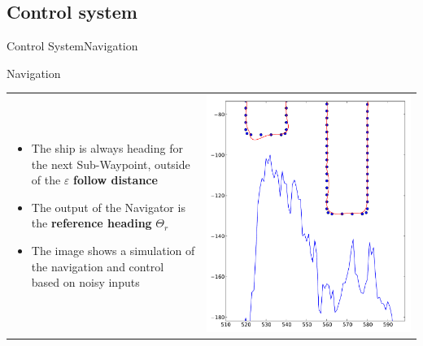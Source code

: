 \subsection{Control system}
\begin{frame}{Control System}{Navigation}
    \begin{block}{Navigation}
		\begin{tabular}{l l}
		\begin{minipage}{0.45\textwidth}
		\begin{itemize}
			\item The ship is always heading for the next Sub-Waypoint, outside of the $\varepsilon$ \textbf{follow distance}
			\item The output of the Navigator is the \textbf{reference heading} $\Theta_r$
			\item The image shows a simulation of the navigation and control based on noisy inputs
		\end{itemize}
		\end{minipage}
		&
		\begin{minipage}{0.50\textwidth}
		\includegraphics[width=\textwidth,keepaspectratio]{control/img/navi}
		\end{minipage}
		\end{tabular}
    \end{block}
\end{frame}

